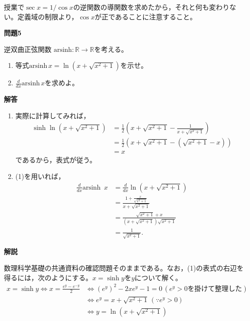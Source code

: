 \documentclass[a4paper,12pt,dvipdfmx,fleqn, oneside]{jsarticle}
\theoremstyle{defstyle}
\theoremstyle{thmx}
\theoremstyle{qesstyle}
\begin{document}
授業で$\sec x = 1/ \cos x$の逆関数の導関数を求めたから，それと何も変わりない。定義域の制限より，$\cos x$が正であることに注意すること。

\begin{shadebox}
    \textbf{問題5}

    \text{　}逆双曲正弦関数 $\text{arsinh} : \mathbb{R} \rightarrow \mathbb{R}$を考える。
    \begin{enumerate}
        \item 等式$\text{arsinh}\, x = \ln(x+\sqrt{x^2+1})$を示せ。
        \item $\frac{d}{dx} \text{arsinh} \, x$を求めよ。
    \end{enumerate}
\end{shadebox}

\begin{screen}
    \textbf{解答}

    \begin{enumerate}
        \item 実際に計算してみれば，
              \begin{align*}
                  \sinh \ln (x + \sqrt{x^2 + 1}) & = \frac{1}{2}\left(x + \sqrt{x^2 +1 } - \frac{1}{x+ \sqrt{x^2 + 1}}\right) \\
                                                 & = \frac{1}{2}(x + \sqrt{x^2 + 1} - (\sqrt{x^2 + 1}-x))                     \\
                                                 & = x
              \end{align*}
              であるから，表式が従う。
        \item (1)を用いれば，
              \begin{align*}
                  \frac{d}{dx} \text{arsinh }\, x & = \frac{d}{dx} \ln (x + \sqrt{x^2+1})                         \\
                                                  & = \frac{1+\frac{x}{\sqrt{x^2+1}}}{x+\sqrt{x^2+1}}             \\
                                                  & = \frac{\sqrt{x^2 + 1} + x}{(x + \sqrt{x^2+1})\sqrt{x^2 + 1}} \\
                                                  & = \frac{1}{\sqrt{x^2+1}}.
              \end{align*}
    \end{enumerate}
\end{screen}

\textbf{解説}

数理科学基礎の共通資料の確認問題そのままである。なお，(1)の表式の右辺を得るには，次のようにする。$x = \sinh y$を$y$について解く。
\begin{align*}
    x = \sinh y \Leftrightarrow x = \frac{e^y - e^{-y}}{2} & \Leftrightarrow (e^y)^2 - 2 x e^y -1 = 0 \, (e^y > 0\text{を掛けて整理した}) \\& \Leftrightarrow e^y = x + \sqrt{x^2 + 1} \, (\because e^y >0) \\ & \Leftrightarrow y = \ln (x+ \sqrt{x^2 + 1})
\end{align*}
\end{document}
